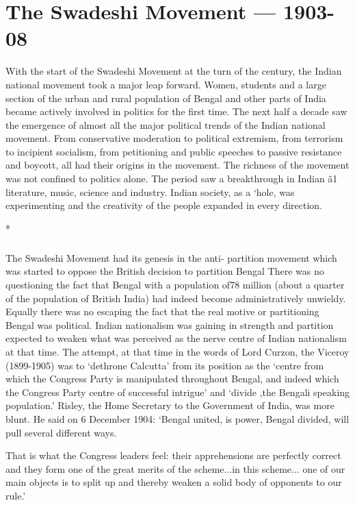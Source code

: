 \chapter{The Swadeshi Movement — 1903-08}\label{chapter:CH10}

With the start of the Swadeshi Movement at the turn of the century, the Indian national movement took a major leap forward. Women, students and a large section of the urban and rural population of Bengal and other parts of India became actively involved in politics for the first time. The next half a decade saw the emergence of almost all the major political trends of the Indian national movement. From conservative moderation to political extremism, from terrorism to incipient socialism, from petitioning and public speeches to passive resistance and boycott, all had their origins in the movement. The richness of the movement was not confined to politics alone. The period saw a breakthrough in Indian ã1 literature, music, science and industry. Indian society, as a `hole, was experimenting and the creativity of the people expanded in every direction.

\begin{center}*\end{center}

\paragraph*{}
The Swadeshi Movement had its genesis in the anti- partition movement which was started to oppose the British decision to partition Bengal There was no questioning the fact that Bengal with a population of78 million (about a quarter of the population of British India) had indeed become administratively unwieldy. Equally there was no escaping the fact that the real motive or partitioning Bengal was political. Indian nationalism was gaining in strength and partition expected to weaken what was perceived as the nerve centre of Indian nationalism at that time. The attempt, at that time in the words of Lord Curzon, the Viceroy (1899-1905) was to `dethrone Calcutta' from its position as the `centre from which the Congress Party is manipulated throughout Bengal, and indeed which the Congress Party centre of successful intrigue' and `divide ,the Bengali speaking population.' Risley, the Home Secretary to the Government of India, was more blunt. He said on 6 December 1904: `Bengal united, is power, Bengal divided, will pull several different ways.

That is what the Congress leaders feel: their apprehensions are perfectly correct and they form one of the great merits of the scheme...in this scheme... one of our main objects is to split up and thereby weaken a solid body of opponents to our rule.'

